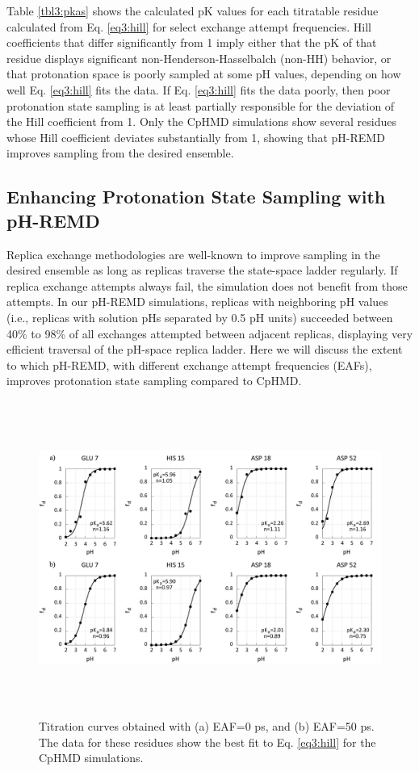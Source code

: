 Table \ref{tbl3:pkas} shows the calculated pK values for each titratable
residue calculated from Eq. \ref{eq3:hill} for select exchange attempt
frequencies.  Hill coefficients that differ significantly from 1 imply either
that the pK of that residue displays significant
non-Henderson-Hasselbalch (non-HH) behavior, or that protonation space is poorly
sampled at some pH values, depending on how well Eq. \ref{eq3:hill} fits the
data. If Eq. \ref{eq3:hill} fits the data poorly, then poor protonation state
sampling is at least partially responsible for the deviation of the Hill
coefficient from 1. Only the CpHMD simulations show several residues whose Hill
coefficient deviates substantially from 1, showing that pH-REMD improves
sampling from the desired ensemble.

\subsection{Enhancing Protonation State Sampling with pH-REMD}

Replica exchange methodologies are well-known to improve sampling in the desired
ensemble \cite{Sugita_ChemPhysLett_1999_v314_p141,
Chodera_JChemPhys_2011_v135_p194110} as long as replicas traverse the
state-space ladder regularly.  If replica exchange attempts always fail, the
simulation does not benefit from those attempts.  In our pH-REMD simulations,
replicas with neighboring pH values (i.e., replicas with solution pHs separated
by 0.5 pH units) succeeded between 40\% to 98\% of all exchanges attempted
between adjacent replicas, displaying very efficient traversal of the pH-space
replica ladder. Here we will discuss the extent to which pH-REMD, with different
exchange attempt frequencies (EAFs), improves protonation state sampling
compared to CpHMD.

\begin{figure}
 \includegraphics[width=6.5in, height=4.06in]{Comparison_good_curves.png}
 \caption{Titration curves obtained with (a) EAF=0 ps, and (b) EAF=50
          ps. The data for these residues show the best fit to Eq.
          \ref{eq3:hill} for the CpHMD simulations.}
 \label{fig3:GoodTitr}
\end{figure}

